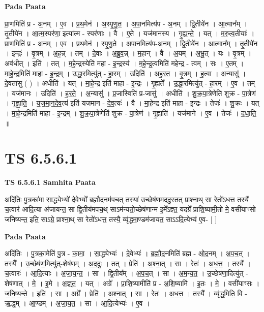 \documentclass[17pt]{extarticle}
\begin{document}
\textbf{Pada Paata} \newline

प्रा॒णमिति॑ प्र - अ॒नम् । ए॒व । प्र॒थ॒मेन॑ । अ॒स्पृ॒णु॒त॒ । अ॒पा॒नमित्य॑प - अ॒नम् । द्वि॒तीये॑न । आ॒त्मान᳚म् । तृ॒तीये॑न । आ॒त्म॒स्पर॑णा॒ इत्या᳚त्म - स्पर॑णाः । वै । ए॒ते । यज॑मानस्य । गृ॒ह्य॒न्ते॒ । यत् । म॒रु॒त्व॒तीयाः᳚ । प्रा॒णमिति॑ प्र - अ॒नम् । ए॒व । प्र॒थ॒मेन॑ । स्पृ॒णु॒ते॒ । अ॒पा॒नमित्य॑प-अ॒नम् । द्वि॒तीये॑न । आ॒त्मान᳚म् । तृ॒तीये॑न । इन्द्रः॑ । वृ॒त्रम् । अ॒ह॒न्न् । तम् । दे॒वाः । अ॒ब्रु॒व॒न्न् । म॒हान् । वै । अ॒यम् । अ॒भू॒त् । यः । वृ॒त्रम् । अव॑धीत् । इति॑ । तत् । म॒हे॒न्द्रस्येति॑ महा - इ॒न्द्रस्य॑ । म॒हे॒न्द्र॒त्वमिति॑ महेन्द्र - त्वम् । सः । ए॒तम् । मा॒हे॒न्द्रमिति॑ माहा - इ॒न्द्रम् । उ॒द्धा॒रमित्यु॑त् - हा॒रम् । उदिति॑ । अ॒ह॒र॒त॒ । वृ॒त्रम् । ह॒त्वा । अ॒न्यासु॑ । दे॒वता॑सु ( ) । अधीति॑ । यत् । मा॒हे॒न्द्र इति॑ माहा - इ॒न्द्रः । गृ॒ह्यते᳚ । उ॒द्धा॒रमित्यु॑त् - हा॒रम् । ए॒व । तम् । यज॑मानः । उदिति॑ । ह॒र॒ते॒ । अ॒न्यासु॑ । प्र॒जास्विति॑ प्र-जासु॑ । अधीति॑ । शु॒क्र॒पा॒त्रेणेति॑ शुक्र - पा॒त्रेण॑ । गृ॒ह्णा॒ति॒ । य॒ज॒मा॒न॒दे॒व॒त्य॑ इति॑ यजमान - दे॒व॒त्यः॑ । वै । मा॒हे॒न्द्र इति॑ माहा - इ॒न्द्रः । तेजः॑ । शु॒क्रः । यत् । मा॒हे॒न्द्रमिति॑ माहा - इ॒न्द्रम् । शु॒क्र॒पा॒त्रेणेति॑ शुक्र - पा॒त्रेण॑ । गृ॒ह्णाति॑ । यज॑माने । ए॒व । तेजः॑ । द॒धा॒ति॒ ॥  \newline





\section{ TS 6.5.6.1 }

\textbf{TS 6.5.6.1 } \newline
\textbf{Samhita Paata} \newline

अदि॑तिः पु॒त्रका॑मा सा॒द्ध्येभ्यो॑ दे॒वेभ्यो᳚ ब्रह्मौद॒नम॑पच॒त् तस्या॑ उ॒च्छेष॑णमददु॒स्तत् प्राश्ना॒थ् सा रेतो॑ऽधत्त॒ तस्यै॑ च॒त्वार॑ आदि॒त्या अ॑जायन्त॒ सा द्वि॒तीय॑मपच॒थ् साऽम॑न्यतो॒च्छेष॑णान्म इ॒मे᳚ऽज्ञ्त॒ यदग्रे᳚ प्राशि॒ष्यामी॒तो मे॒ वसी॑याꣳसो जनिष्यन्त॒ इति॒ साऽग्रे॒ प्राश्ना॒थ् सा रेतो॑ऽधत्त॒ तस्यै॒ व्यृ॑द्धमा॒ण्डम॑जायत॒ साऽऽदि॒त्येभ्य॑ ए॒व- [  ] \newline

\textbf{Pada Paata} \newline

अदि॑तिः । पु॒त्रका॒मेति॑ पु॒त्र - का॒मा॒ । सा॒द्ध्येभ्यः॑ । दे॒वेभ्यः॑ । ब्र॒ह्मौ॒द॒नमिति॑ ब्रह्म - ओ॒द॒नम् । अ॒प॒च॒त् । तस्यै᳚ । उ॒च्छेष॑ण॒मित्यु॑त्-शेष॑णम् । अ॒द॒दुः॒ । तत् । प्रेति॑ । अ॒श्ना॒त् । सा । रेतः॑ । अ॒ध॒त्त॒ । तस्यै᳚ । च॒त्वारः॑ । आ॒दि॒त्याः । अ॒जा॒य॒न्त॒ । सा । द्वि॒तीय᳚म् । अ॒प॒च॒त् । सा । अ॒म॒न्य॒त॒ । उ॒च्छेष॑णा॒दित्यु॑त् - शेष॑णात् । मे॒ । इ॒मे । अ॒ज्ञ्॒त॒ । यत् । अग्रे᳚ । प्रा॒शि॒ष्यामीति॑ प्र - अ॒शि॒ष्यामि॑ । इ॒तः । मे॒ । वसी॑याꣳसः । ज॒नि॒ष्य॒न्ते॒ । इति॑ । सा । अग्रे᳚ । प्रेति॑ । अ॒श्ना॒त् । सा । रेतः॑ । अ॒ध॒त्त॒ । तस्यै᳚ । व्यृ॑द्ध॒मिति॒ वि - ऋ॒द्ध॒म् । आ॒ण्डम् । अ॒जा॒य॒त॒ । सा । आ॒दि॒त्येभ्यः॑ । ए॒व ।  \newline
\end{document}
